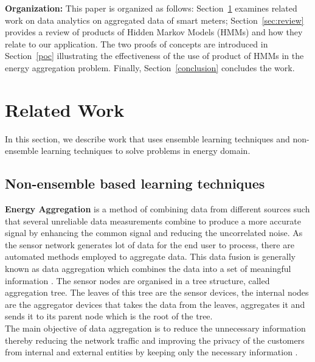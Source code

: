 \documentclass[runningheads,a4paper]{llncs}
\begin{document}
\noindent \textbf{Organization:} This paper is organized as follows: Section~\ref{related} examines related work on data analytics on aggregated data of smart meters; Section~\ref{sec:review} provides a review of products of Hidden Markov Models (HMMs) and how they relate to our application. The two proofs of concepts are introduced in Section~\ref{poc} illustrating the effectiveness of the use of product of HMMs in the energy aggregation problem. Finally, Section~\ref{conclusion} concludes the work.

\section{Related Work}
\label{related}
In this section, we describe work that uses ensemble learning techniques and non-ensemble learning techniques to solve problems in energy domain.
\subsection{Non-ensemble based learning techniques}


\noindent \textbf{Energy Aggregation}
is a method of combining data from different sources such that several unreliable data measurements combine to produce a more accurate signal by enhancing the common signal and reducing the uncorrelated noise. As the sensor network generates lot of data for the end user to process, there are automated methods employed to aggregate data. This data fusion is generally known as data aggregation which combines the data into a set of meaningful information \cite{Heinzelman00energy}.
The sensor nodes are organised in a tree structure, called aggregation tree. The leaves of this tree are the sensor devices, the internal nodes are the aggregator devices that takes the data from the leaves, aggregates it and sends it to its parent node which is the root of the tree. \\
The main objective of data aggregation is to reduce the unnecessary information thereby reducing the network traffic and improving the privacy of the customers from internal and external entities by keeping only the necessary information \cite{taban}. 


\end{document}
